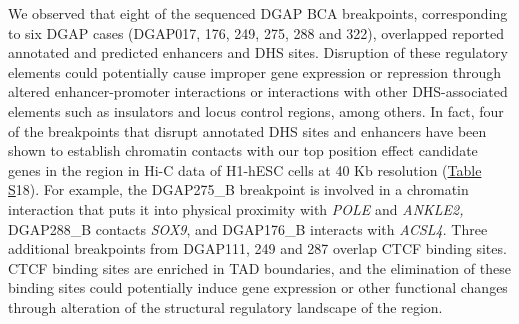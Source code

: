 \documentclass[a4paper,twoside=true,openright,parskip=full,chapterprefix=true,11pt,headings=normal,bibliography=totoc,listof=totoc,titlepage=on,captions=tableabove,draft=false]{scrreprt}
\theoremstyle{definition}
\theoremstyle{definition}
\theoremstyle{definition}
\theoremstyle{remark}
\begin{document}
We observed that eight of the sequenced DGAP BCA breakpoints,
corresponding to six DGAP cases (DGAP017, 176, 249, 275, 288 and 322),
overlapped reported annotated and predicted enhancers and DHS sites.
Disruption of these regulatory elements could potentially cause improper
gene expression or repression through altered enhancer-promoter
interactions or interactions with other DHS-associated elements such as
insulators and locus control regions, among others. In fact, four of the
breakpoints that disrupt annotated DHS sites and enhancers have been
shown to establish chromatin contacts with our top position effect
candidate genes in the region in Hi-C data of H1-hESC cells at 40 Kb
resolution (\protect\hyperlink{position-effect-sub-tab}{Table S}18). For
example, the DGAP275\_B breakpoint is involved in a chromatin
interaction that puts it into physical proximity with \emph{POLE} and
\emph{ANKLE2,} DGAP288\_B contacts \emph{SOX9}, and DGAP176\_B interacts
with \emph{ACSL4}. Three additional breakpoints from DGAP111, 249 and
287 overlap CTCF binding sites. CTCF binding sites are enriched in TAD
boundaries,\citep{Dixon2012} and the elimination of these binding sites
could potentially induce gene expression or other functional changes
through alteration of the structural regulatory landscape of the
region.\citep{Lupianez2015}
\end{document}

